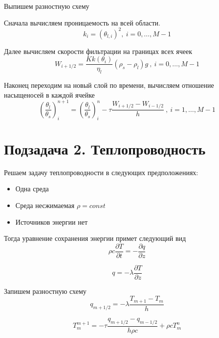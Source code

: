 \documentclass[12pt]{article}
\newcommand{\pd}[2]{\frac{\partial #1}{\partial #2}}
\begin{document}
Выпишем разностную схему

Сначала вычисляем проницаемость на всей области.
\begin{equation}
k_i = (\theta_{l,i})^2 , \ i = 0,  \dots ,M-1
\label{perm_razn}
\end{equation}

Далее вычисляем скорости фильтрации на границах всех ячеек
\begin{equation}
W_{i+1/2} = \frac{K k(\theta_i)}{\eta_l}(\rho_s-\rho_l)g \ , \ i = 0,  \dots ,M-1
\label{Darsi_razn}
\end{equation}

Наконец переходим на новый слой по времени, вычисляем отношение насыщеносей в каждой ячейке
\begin{equation}
\left(\frac{\theta_l}{\theta_s}\right)_i^{n+1} = \left(\frac{\theta_l}{\theta_s}\right)_i^n - \tau\frac{W_{i+1/2} - W_{i-1/2}}{h} \ , \ i = 1,  \dots ,M-1
\label{filtr_razn}
\end{equation}

\newpage
\section*{Подзадача 2. Теплопроводность}
Решаем задачу теплопроводности в следующих предположениях:
\begin{itemize}
\item Одна среда
\item Среда несжимаемая $\rho = const$
\item Источников энергии нет
\end{itemize}

Тогда уравнение сохранения энергии примет следующий вид
\begin{equation}
\rho c \pd{T}{t} = - \pd{q}{z}
\label{termal_1}
\end{equation}

\begin{equation}
q = - \lambda\pd{T}{z}
\label{termal_2}
\end{equation}

Запишем разностную схему
\begin{equation}
q_{m+1/2} = - \lambda\frac{T_{m+1} - T_m}{h}
\label{termal_razn_1}
\end{equation}

\begin{equation}
T_m^{m+1} = - \tau\frac{q_{m+1/2} - q_{m-1/2}}{h\rho c} + \rho c T_m^n
\label{termal_razn_2}
\end{equation}
\end{document}
